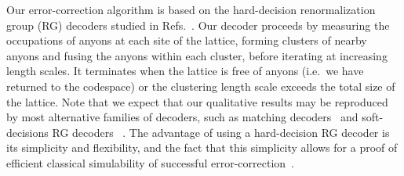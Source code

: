 \documentclass[aps, prl, letterpaper, twocolumn, superscriptaddress, notitlepage, 10pt]{revtex4-1}
\begin{document}
	Our error-correction algorithm is based on the hard-decision renormalization group (RG) decoders studied in Refs.~\cite{?}. Our decoder proceeds by measuring the occupations of anyons at each site of the lattice, forming clusters of nearby anyons and fusing the anyons within each cluster, before iterating at increasing length scales. It terminates when the lattice is free of anyons (i.e.~we have returned to the codespace) or the clustering length scale exceeds the total size of the lattice.   Note that we expect that our qualitative results may be reproduced by most alternative families of decoders, such as matching decoders~\cite{?} and soft-decisions RG decoders~\cite{?} . The advantage of using a hard-decision RG decoder is its simplicity and flexibility, and the fact that this simplicity allows for a proof of efficient classical simulability of successful error-correction~\cite{RGsim}.
\end{document}
